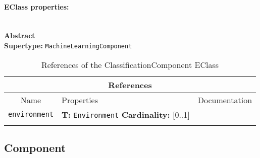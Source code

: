 \documentclass{article}
\begin{document}
\paragraph{EClass properties:} \hspace{0pt} \\ \indent
\textbf{Abstract}
\\
\textbf{Supertype: }\texttt{MachineLearningComponent}
\begin{table}[H]
\footnotesize
\begin{tabularx}{\textwidth}{|c| p{4 cm} | X |}
\hline
\multicolumn{3}{|c|}{\textbf{References}} \\
\hline
Name & Properties & Documentation \\ \hline \hline
\texttt{environment}
 & 
\textbf{T:} \texttt{Environment}
\newline
\textbf{Cardinality:} [0..1]
 & \\ \hline
\caption{References of the ClassificationComponent EClass}
\end{tabularx}
\label{e4smClassificationComponentref}
\end{table}
\subsection[Component]{Component}
\label{e4smComponent}
\end{document}
